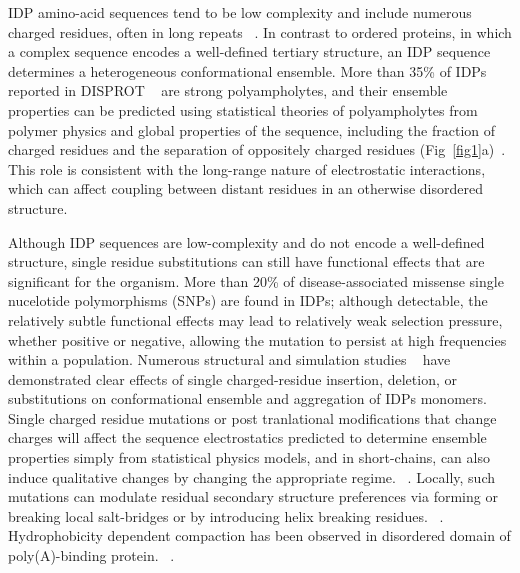 \documentclass[journal=jacsat,manuscript=article]{achemso}
\begin{document}
IDP amino-acid sequences tend to be low complexity and include numerous charged residues, often in long repeats ~\cite{Uversky2013a}. In contrast to ordered proteins, in which a complex sequence encodes a well-defined tertiary structure, an IDP sequence determines a heterogeneous conformational ensemble.  More than 35\% of 
IDPs reported in DISPROT ~\cite {Sickmeier2007a} are strong polyampholytes, and their ensemble properties can be predicted using statistical theories of polyampholytes from polymer physics and global properties of the sequence, including the fraction of charged residues and the separation of oppositely charged residues (Fig~\ref{fig1}a)~\cite{Das2015,Das2013a}.  This role is consistent with the long-range nature of electrostatic interactions, which can affect coupling between distant residues in an otherwise disordered structure.  


Although IDP sequences are low-complexity and do not encode a well-defined structure, single residue substitutions can still have functional effects that are significant for the organism.  More than 20\% of disease-associated missense single nucelotide polymorphisms (SNPs) are found in IDPs;\cite{Vacic2012a} although detectable, the relatively subtle functional effects may lead to relatively weak selection pressure, whether positive or negative, allowing the mutation to persist at high frequencies within a population.  Numerous structural and simulation studies ~\cite{Larini2013b,Ganguly2015,Viet2014a,Viet2013,Truong2014a,Zhan2013a,Xu2013a} have demonstrated clear effects of single charged-residue insertion, deletion, or substitutions on conformational ensemble and aggregation of IDPs monomers. Single charged residue mutations or post tranlational modifications that change charges will affect the sequence electrostatics %
predicted to determine ensemble properties simply from statistical physics models, and in short-chains, can also induce qualitative changes by changing the appropriate regime. ~\cite{Das2015,Larini2013b,Bah2016,He2015}. 
Locally, such mutations can modulate residual secondary structure preferences via forming or breaking local salt-bridges or by introducing helix breaking residues. ~\cite{AlexanderConicella2016,Ganguly2015,Zhan2013a}. Hydrophobicity dependent compaction has been observed in disordered domain of poly(A)-binding protein. ~\cite {Riback2017}.
  
\end{document}
